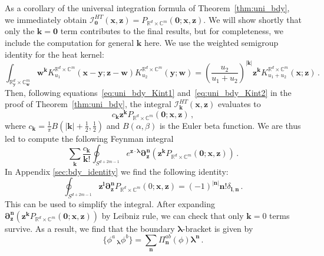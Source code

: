 \documentclass[11pt]{article}
\newcommand{\C}{\mathbb{C}}
\newcommand{\R}{\mathbb{R}}
\numberwithin{equation}{section}
\begin{document}
As a corollary of the universal integration formula of Theorem~\ref{thm:uni_bdy}, we immediately obtain $\mathcal{I}^{HT}_{\boldsymbol{0}}(\boldsymbol{x},\boldsymbol{z}) =  P_{\R^d\times \C^{m}}(\boldsymbol{0};\boldsymbol{x},\boldsymbol{z})$. We will show shortly that only the $\boldsymbol{k}=\boldsymbol{0}$ term contributes to the final results, but for completeness, we include the computation for general $\boldsymbol{k}$ here. We use the weighted semigroup identity for the heat kernel:
\begin{equation}
\int_{\mathbb{R}^{d}_{\boldsymbol{y}}\times \C^m_{\boldsymbol{w}}}\!\!  \boldsymbol{w}^{\boldsymbol{k}} K^{\R^{d}\times\C^m}_{u_1}\!(\boldsymbol{x} - \boldsymbol{y} ;\boldsymbol{z} - \boldsymbol{w})K^{\R^{d}\times\C^m}_{u_2}\!(\boldsymbol{y};\boldsymbol{w}) = \left(\frac{u_2}{u_1+u_2} \right)^{|\boldsymbol{k}|} \boldsymbol{z}^{\boldsymbol{k}} K^{\R^{d}\times\C^m}_{u_1 + u_2}\!(\boldsymbol{x};\boldsymbol{z})\,.
\end{equation}
Then, following equations~\eqref{eq:uni_bdy_Kint1} and~\eqref{eq:uni_bdy_Kint2} in the proof of Theorem~\ref{thm:uni_bdy}, the integral $\mathcal{I}^{HT}_{\boldsymbol{k}}(\boldsymbol{x},\boldsymbol{z})$ evaluates to
\begin{equation}
c_{\boldsymbol{k}} \boldsymbol{z}^{\boldsymbol{k}}P_{\R^d\times \C^{m}}(\boldsymbol{0};\boldsymbol{x},\boldsymbol{z})\,,
\end{equation}
where $c_{\boldsymbol{k}} = \frac{1}{\pi}B(|\boldsymbol{k}|+\frac{1}{2},\frac{1}{2})$ and $B(\alpha,\beta)$ is the Euler beta function. 
 We are thus led to compute the following Feynman integral
 \begin{equation}
\sum_{\boldsymbol{k}}\frac{c_{\boldsymbol{k}}}{\boldsymbol{k}!}\oint_{S^{d+2m-1}}e^{\boldsymbol{z}\cdot \boldsymbol{\lambda}} \boldsymbol{\partial}_{\boldsymbol{z}}^{\boldsymbol{n}} \left( \boldsymbol{z}^{\boldsymbol{k}}P_{\R^d\times \C^{m}}(\boldsymbol{0};\boldsymbol{x},\boldsymbol{z})\right)\,.
 \end{equation}
In Appendix \ref{sec:bdy_identity} we find the following identity:
\begin{equation}\label{eq:bdy_identity}
	\oint_{S^{d+2m-1}}\boldsymbol{z}^{\boldsymbol{l}} \boldsymbol{\partial}_{\boldsymbol{z}}^{\boldsymbol{n}} P_{\R^d\times \C^{m}}(0;\boldsymbol{x},\boldsymbol{z}) = (-1)^{|\boldsymbol{n}|}\boldsymbol{n}!\delta_{\boldsymbol{l},\boldsymbol{n}}\,.
 \end{equation}
This can be used to simplify the integral. After expanding $\boldsymbol{\partial}_{\boldsymbol{z}}^{\boldsymbol{n}} ( \boldsymbol{z}^{\boldsymbol{k}}P_{\R^d\times \C^{m}}(\boldsymbol{0};\boldsymbol{x},\boldsymbol{z}))$ by Leibniz rule, we can check that only $\boldsymbol{k} = 0$ terms survive. As a result, we find that the boundary $\boldsymbol{\lambda}$-bracket is given by  
\begin{equation}
	\{\phi^a\,_{\boldsymbol{\lambda}}\phi^b\} = \sum_{\boldsymbol{n}} \Pi_{\boldsymbol{n}}^{ab}(\phi) \boldsymbol{\lambda}^{\boldsymbol{n}}\,.
\end{equation}
\end{document}
